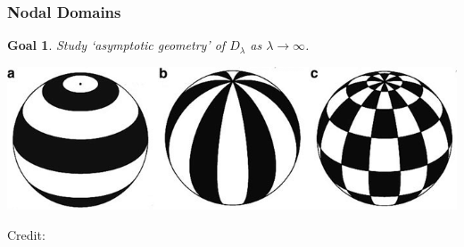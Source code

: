 \documentclass[usenames,dvipsnames,12pt]{beamer}
\newtheorem*{goal}{Goal}
\begin{document}
\begin{frame}
    \frametitle{Nodal Domains}

    \begin{goal}
        Study `asymptotic geometry' of $D_\lambda$ as $\lambda \to \infty$.
    \end{goal}

    \pause

    \vspace{20pt}

    \begin{center}
        \includegraphics[scale=0.3]{zonalsectorialtesseralharmonics.png}

        \hspace*{10pt}\hbox{\scriptsize Credit:}
    \end{center}



        


\end{frame}
\end{document}
